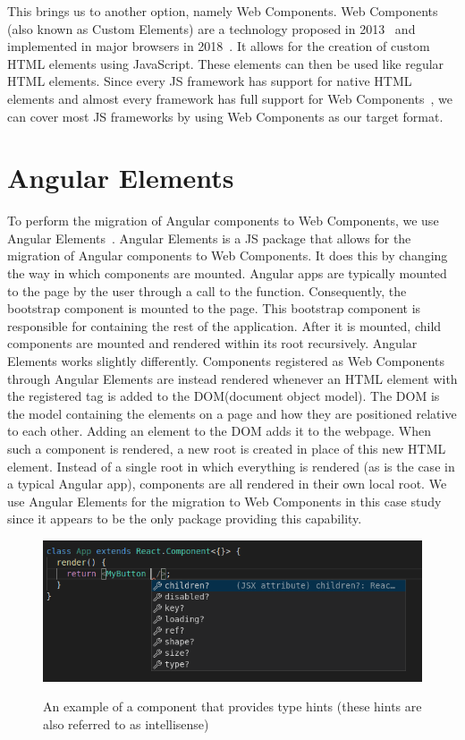 This brings us to another option, namely Web Components. Web Components (also known as Custom Elements) are a technology proposed in 2013~ and implemented in major browsers in 2018~. It allows for the creation of custom HTML elements using JavaScript. These elements can then be used like regular HTML elements. Since every JS framework has support for native HTML elements and almost every framework has full support for Web Components~, we can cover most JS frameworks by using Web Components as our target format.

\section{Angular Elements}\label{sec:bg:angularelements}
To perform the migration of Angular components to Web Components, we use Angular Elements~. Angular Elements is a JS package that allows for the migration of Angular components to Web Components. It does this by changing the way in which components are mounted. Angular apps are typically mounted to the page by the user through a call to the  function. Consequently, the bootstrap component is mounted to the page. This bootstrap component is responsible for containing the rest of the application. After it is mounted, child components are mounted and rendered within its root recursively. Angular Elements works slightly differently. Components registered as Web Components through Angular Elements are instead rendered whenever an HTML element with the registered tag is added to the DOM\@ (document object model). The DOM is the model containing the elements on a page and how they are positioned relative to each other. Adding an element to the DOM adds it to the webpage. When such a component is rendered, a new root is created in place of this new HTML element. Instead of a single root in which everything is rendered (as is the case in a typical Angular app), components are all rendered in their own local root. We use Angular Elements for the migration to Web Components in this case study since it appears to be the only package providing this capability.

\begin{figure}[htbp]
  \caption{An example of a component that provides type hints (these hints are also referred to as intellisense)}
  \includegraphics[width=\columnwidth]{figures/background/hinting.png}
  \label{fig:bg:hinting}
  \centering
\end{figure}

